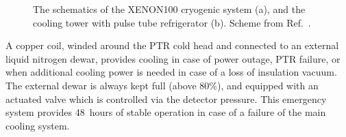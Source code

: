 \begin{figure}[!b]
\centering
{}
\caption[The schematics of the XENON100 cryogenic system, and the cooling tower with pulse tube refrigerator]{The schematics of the XENON100 cryogenic system (a), and the cooling tower with pulse tube refrigerator (b). Scheme from Ref.~\cite{xe100-instrument}.}
\label{figCoolingTower}
\end{figure}

A copper coil, winded around the PTR cold head and connected to an external liquid nitrogen dewar, provides cooling in case of power outage, PTR failure, or when additional cooling power is needed in case of a loss of insulation vacuum. The external dewar is always kept full (above 80\%), and equipped with an actuated valve which is controlled via the detector pressure. This emergency system provides 48~hours of stable operation in case of a failure of the main cooling system.

